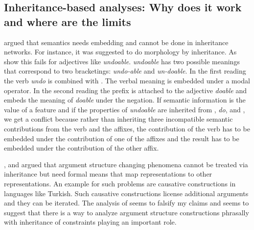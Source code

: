 \subsection{Inheritance-based analyses: Why does it work and where are the limits}

\citet{MuellerPersian} argued that semantics needs embedding and cannot be done in inheritance
networks. For instance, it was suggested to do morphology by inheritance. As \citet{KN93a} show this
fails for adjectives like \emph{undoable}. \emph{undoable} has two possible meanings that correspond
to two bracketings: \emph{undo-able} and \emph{un-doable}. In the first reading the verb \emph{undo}
is combined with . The verbal meaning is embedded under a modal operator. In the second
reading the prefix  is attached to the adjective \emph{doable} and embeds the meaning
of \emph{doable} under the negation. If semantic information is the value of a feature and if
the properties of \emph{undoable} are inherited from , \emph{do}, and , we
get a conflict because rather than inheriting three incompatible semantic contributions from the
verb and the affixes, the contribution of the verb has to be embedded under the contribution of one
of the affixes and the result has to be embedded under the contribution of the other affix.  

\citet{MuellerLehrbuch1}, \citet{MuellerUnifying} and \citet{MWArgSt} argued that argument structure changing
phenomena cannot be treated via inheritance but need formal means that map representations to other
representations. An example for such problems are causative constructions in languages like Turkish.
Such causative constructions license additional arguments and they can be iterated. The analysis of
\citet{AGT2014a} seems to falsify my claims and seems to suggest that there is a way to analyze
argument structure constructions phrasally with inheritance of constraints playing an important role.

